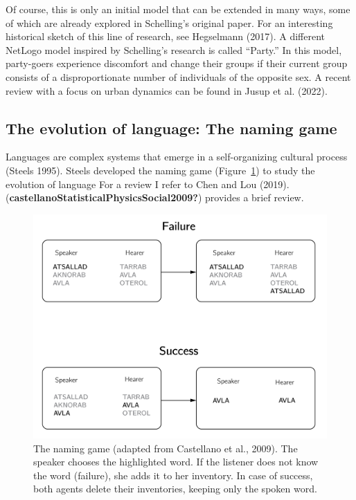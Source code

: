\documentclass[
  a4paper,
  DIV=11,
  numbers=noendperiod]{scrreprt}
\begin{document}
Of course, this is only an initial model that can be extended in many
ways, some of which are already explored in Schelling's original paper.
For an interesting historical sketch of this line of research, see
Hegselmann (2017). A different NetLogo model inspired by Schelling's
research is called ``Party.'' In this model, party-goers experience
discomfort and change their groups if their current group consists of a
disproportionate number of individuals of the opposite sex. A recent
review with a focus on urban dynamics can be found in Jusup et al.
(2022).

\hypertarget{sec-The-evolution-of-language-The-naming-game}{%
\subsection{The evolution of language: The naming
game}\label{sec-The-evolution-of-language-The-naming-game}}

Languages are complex systems that emerge in a self-organizing cultural
process (Steels 1995). Steels developed the naming game
(Figure~\ref{fig-ch7-img2-old-90}) to study the evolution of language
For a review I refer to Chen and Lou (2019).
(\textbf{castellanoStatisticalPhysicsSocial2009?}) provides a brief
review.

\begin{figure}

{\centering \includegraphics{media/ch7/ch7-2__figure92.png}

}

\caption{\label{fig-ch7-img2-old-90}The naming game (adapted from
Castellano et al., 2009). The speaker chooses the highlighted word. If
the listener does not know the word (failure), she adds it to her
inventory. In case of success, both agents delete their inventories,
keeping only the spoken word.}

\end{figure}
\end{document}
